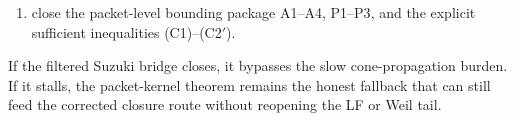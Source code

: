 \begin{remark}
\begin{enumerate}
  $S_J=A_J-P_J$ kept as the fallback constructive target and
  Corollary~\ref{cor:regularized-p7} as the clean Poisson-regularized
  verification criterion on each admissible dictionary, while
  Propositions~\ref{prop:canonical-half-atom-bounds} and
  \ref{prop:canonical-half-atom-pilot} record the first nonvacuous pilot
  regime where the finite criterion actually closes;
  \item close the packet-level bounding package
  \textup{A1}--\textup{A4}, \textup{P1}--\textup{P3}, and the explicit
  sufficient inequalities \textup{(C1)}--\textup{(C2$'$)}.
\end{enumerate}
If the filtered Suzuki bridge closes, it bypasses the slow cone-propagation
burden. If it stalls, the packet-kernel theorem remains the honest fallback
that can still feed the corrected closure route without reopening the LF or
Weil tail.
\end{remark}

